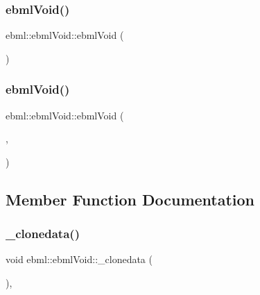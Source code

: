 \subsubsection{\texorpdfstring{ebml\+Void()}{ebmlVoid()}\hspace{0.1cm}{\footnotesize\ttfamily [1/2]}}
{\footnotesize\ttfamily ebml\+::ebml\+Void\+::ebml\+Void (\begin{DoxyParamCaption}\item[{const \mbox{\hyperlink{classebml_1_1ebmlVoidClass}{ebml\+Void\+Class}} $\ast$}]{ }\end{DoxyParamCaption})\hspace{0.3cm}{\ttfamily [protected]}}

\mbox{\label{classebml_1_1ebmlVoid_a8f029c869cc3f14d1eea3c358e56bf1a}} 
\subsubsection{\texorpdfstring{ebml\+Void()}{ebmlVoid()}\hspace{0.1cm}{\footnotesize\ttfamily [2/2]}}
{\footnotesize\ttfamily ebml\+::ebml\+Void\+::ebml\+Void (\begin{DoxyParamCaption}\item[{const \mbox{\hyperlink{classebml_1_1ebmlVoidClass}{ebml\+Void\+Class}} $\ast$}]{,  }\item[{size\+\_\+t}]{ }\end{DoxyParamCaption})\hspace{0.3cm}{\ttfamily [protected]}}



\subsection{Member Function Documentation}
\mbox{\label{classebml_1_1ebmlVoid_a1319a15cbec91a7f52763c30d7fa3a18}} 
\subsubsection{\texorpdfstring{\+\_\+clonedata()}{\_clonedata()}}
{\footnotesize\ttfamily void ebml\+::ebml\+Void\+::\+\_\+clonedata (\begin{DoxyParamCaption}\item[{const \mbox{\hyperlink{classebml_1_1ebmlElement}{ebml\+Element}} $\ast$}]{ }\end{DoxyParamCaption})\hspace{0.3cm}{\ttfamily [protected]}, {\ttfamily [virtual]}}



